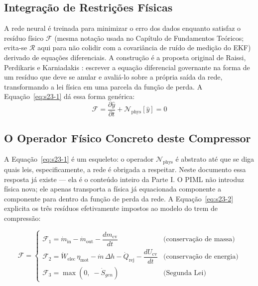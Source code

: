 \documentclass[12pt,a4paper]{article}
\numberwithin{equation}{section}
\numberwithin{table}{section}
\numberwithin{figure}{section}
\begin{document}
{	\subsection{Integração de Restrições Físicas}
	A rede neural é treinada para minimizar o erro dos dados enquanto satisfaz o resíduo físico $\mathcal{F}$ (mesma notação usada no Capítulo de Fundamentos Teóricos; evita-se $\mathcal{R}$ aqui para não colidir com a covariância de ruído de medição do EKF) derivado de equações diferenciais. A construção é a proposta original de Raissi, Perdikaris e Karniadakis \cite{piml}: escrever a equação diferencial governante na forma de um resíduo que deve se anular e avaliá-lo sobre a própria saída da rede, transformando a lei física em uma parcela da função de perda. A Equação~\eqref{eq:s23-1} dá essa forma genérica:
	\begin{equation}\label{eq:s23-1}
 \mathcal{F} = \frac{\partial \hat{y}}{\partial t} + \mathcal{N}_{\text{phys}}[\hat{y}] = 0
\end{equation}

	\subsection{O Operador Físico Concreto deste Compressor}

	A Equação~\eqref{eq:s23-1} é um esqueleto: o operador $\mathcal{N}_{\text{phys}}$ é abstrato até que se diga quais leis, especificamente, a rede é obrigada a respeitar. Neste documento essa resposta já existe — ela é o conteúdo inteiro da Parte I. O PIML não introduz física nova; ele apenas transporta a física já equacionada componente a componente para dentro da função de perda da rede. A Equação~\eqref{eq:s23-2} explicita os três resíduos efetivamente impostos ao modelo do trem de compressão:

	\begin{equation}\label{eq:s23-2}
	\mathcal{F} = \begin{cases}
		\mathcal{F}_1 = \dot{m}_{\text{in}} - \dot{m}_{\text{out}} - \dfrac{dm_{\text{cv}}}{dt} & \text{(conservação de massa)} \\[10pt]
		\mathcal{F}_2 = \dot{W}_{\text{elec}}\,\eta_{\text{mot}} - \dot{m}\,\Delta h - \dot{Q}_{\text{rej}} - \dfrac{dU_{\text{cv}}}{dt} & \text{(conservação de energia)} \\[10pt]
		\mathcal{F}_3 = \max\left(0,\; -\dot{S}_{gen}\right) & \text{(Segunda Lei)}
	\end{cases}
\end{equation}

}
\end{document}
